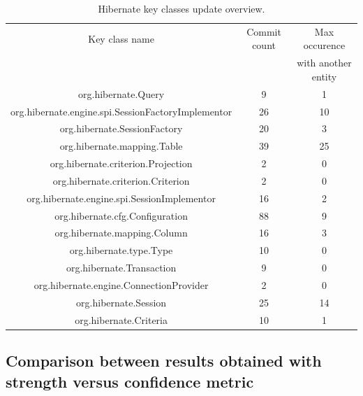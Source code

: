\documentclass[runningheads]{comsis2}
\begin{document}
\begin{table}[!h]
\setlength\tabcolsep{3.5pt}
\caption{ Hibernate key classes update overview.}
\label{tab:overviewcommit:hibernate}
\centering
\begin{tabular}{|c|c|c|}
\hline
Key class name &	Commit count	&	Max occurence 	 \\
&		&	with another entity	 \\
\hline

org.hibernate.Query	&	9	&	1	\\
org.hibernate.engine.spi.SessionFactoryImplementor	&	26	&	10	\\
org.hibernate.SessionFactory	&	20	&	3	\\
org.hibernate.mapping.Table	&	39	&	25	\\
org.hibernate.criterion.Projection	&	2	&	0	\\
org.hibernate.criterion.Criterion	&	2	&	0	\\
org.hibernate.engine.spi.SessionImplementor	&	16	&	2	\\
org.hibernate.cfg.Configuration	&	88	&	9	\\
org.hibernate.mapping.Column	&	16	&	3	\\
org.hibernate.type.Type	&	10	&	0	\\
org.hibernate.Transaction	&	9	&	0	\\
org.hibernate.engine.ConnectionProvider	&	2	&	0	\\
org.hibernate.Session	&	25	&	14	\\
org.hibernate.Criteria	&	10	&	1	\\


\hline
\end{tabular}
\end{table}



\subsection{Comparison between results obtained with strength versus confidence metric}
\label{sec:measure_metrics}
\end{document}
